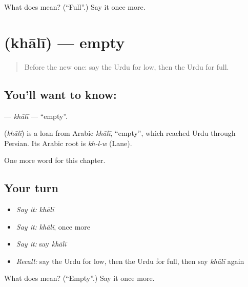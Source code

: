 \begin{tcolorbox}[breakable,colback=teal!4,colframe=teal!35!black,title={Before you move on}]
What does  mean? (\textquotedblleft{}Full\textquotedblright{}.) Say it once more.
\end{tcolorbox}
\section[\texorpdfstring{\ur{خالی} (khālī)}{خالی (khālī)}]{ (khālī) — empty}

\label{lesson:UR-C72-khali}



\begin{quote}
Before the new one: say the Urdu for low, then the Urdu for full.
\end{quote}

\subsection*{You'll want to know: }
\textbf{} — \emph{khālī} — \textquotedblleft{}empty\textquotedblright{}.

\begin{cousinweb}
\textbf{} (\emph{khālī}) is a loan from Arabic \emph{khālī}, \textquotedblleft{}empty\textquotedblright{}, which reached Urdu through Persian. Its Arabic root is \emph{kh-l-w} (Lane).
\end{cousinweb}

\begin{grammarlens}[title={What you've built}]
One more word for this chapter.
\end{grammarlens}

\subsection*{Your turn}
\begin{itemize}
\raggedright
  \item \emph{Say it:} \emph{khālī}
  \item \emph{Say it:} \emph{khālī}, once more
  \item \emph{Say it:} say \emph{khālī}
  \item \emph{Recall:} say the Urdu for low, then the Urdu for full, then say \emph{khālī} again
\end{itemize}

\begin{tcolorbox}[breakable,colback=teal!4,colframe=teal!35!black,title={Before you move on}]
What does  mean? (\textquotedblleft{}Empty\textquotedblright{}.) Say it once more.
\end{tcolorbox}

